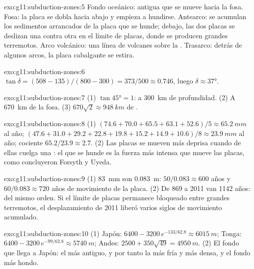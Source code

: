 \begin{solution}{exo:g11:subduction-zones:5}
Fondo oceánico:  antigua que se mueve hacia la fosa. Fosa: la placa se
dobla hacia abajo y empieza a hundirse. Antearco: se acumulan los sedimentos
arrancados de la placa que se hunde; debajo, las dos placas se deslizan una
contra otra en el límite de placas, donde se producen grandes terremotos. Arco
volcánico: una línea de volcanes sobre la . Trasarco: detrás de algunos
arcos, la placa cabalgante se estira.
\end{solution}

\begin{solution}{exo:g11:subduction-zones:6}
$\tan\delta = (508 - 135)/(800 - 300) = 373/500 \approx 0.746$, luego
$\delta \approx \ang{37}$.
\end{solution}

\begin{solution}{exo:g11:subduction-zones:7}
(1) $\tan\ang{45} = 1$: a \qty{300}{km} de profundidad. (2) A \qty{670}{km} de
la fosa. (3) $670\sqrt{2} \approx \qty{948}{km}$ de .
\end{solution}

\begin{solution}{exo:g11:subduction-zones:8}
(1) $(74.6 + 70.0 + 65.5 + 63.1 + 52.6)/5 \approx \qty{65.2}{mm}$ al año;
$(47.6 + 31.0 + 29.2 + 22.8 + 19.8 + 15.2 + 14.9 + 10.6)/8 \approx
\qty{23.9}{mm}$ al año; cociente $65.2/23.9 \approx 2.7$. (2) Las placas se
mueven más deprisa cuando de ellas cuelga una : el  que se
hunde es la fuerza más intensa que mueve las placas, como concluyeron Forsyth
y Uyeda.
\end{solution}

\begin{solution}{exo:g11:subduction-zones:9}
(1) \qty{83}{mm} son \qty{0.083}{m}: $50/0.083 \approx 600$ años y
$60/0.083 \approx 720$ años de movimiento de la placa. (2) De 869 a 2011 van
1142 años: del mismo orden. Si el límite de placas permanece bloqueado entre
grandes terremotos, el desplazamiento de 2011 liberó varios siglos de
movimiento acumulado.
\end{solution}

\begin{solution}{exo:g11:subduction-zones:10}
(1) Japón: $6400 - 3200\,e^{-133/62.8} \approx \qty{6015}{m}$; Tonga:
$6400 - 3200\,e^{-99/62.8} \approx \qty{5740}{m}$; Andes:
$2500 + 350\sqrt{49} = \qty{4950}{m}$. (2) El fondo que llega a Japón: el más
antiguo, y por tanto la  más fría y más densa, y el fondo más hondo.
\end{solution}

